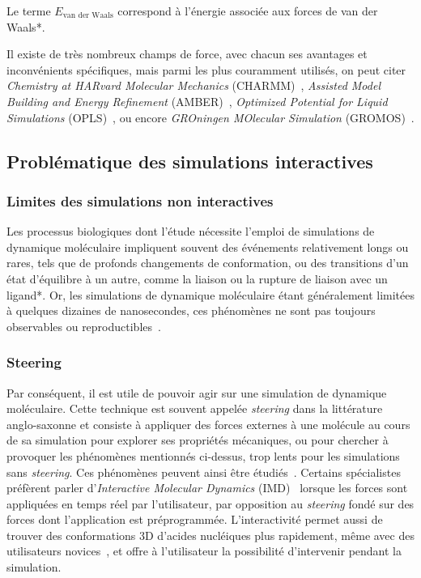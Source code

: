 	Le terme $E_\text{van der Waals}$ correspond à l'énergie associée aux forces de van der Waals*.
	
	Il existe de très nombreux champs de force, avec chacun ses avantages et inconvénients spécifiques, mais parmi les plus couramment utilisés, on peut citer \emph{Chemistry at HARvard Molecular Mechanics} (CHARMM)~\cite{brooks1983charmm, brooks2009charmm}, \emph{Assisted Model Building and Energy Refinement} (AMBER)~\cite{cornell1995second, wang2004development}, \emph{Optimized Potential for Liquid Simulations} (OPLS)~\cite{jorgensen1996development, kaminski2001evaluation}, ou encore \emph{GROningen MOlecular Simulation} (GROMOS)~\cite{scott1999gromos, oostenbrink2004biomolecular}.
	
    
	\FloatBarrier \subsection{Problématique des simulations interactives}
	
	\subsubsection{Limites des simulations non interactives}
	Les processus biologiques dont l'étude nécessite l'emploi de simulations de dynamique moléculaire impliquent souvent des événements relativement longs ou rares, tels que de profonds changements de conformation, ou des transitions d'un état d'équilibre à un autre, comme la liaison ou la rupture de liaison avec un ligand*. Or, les simulations de dynamique moléculaire étant généralement limitées à quelques dizaines de nanosecondes, ces phénomènes ne sont pas toujours observables ou reproductibles~\cite{phillips2005scalable}.
	
	\subsubsection{Steering}
	Par conséquent, il est utile de pouvoir agir sur une simulation de dynamique moléculaire. Cette technique est souvent appelée \emph{steering} dans la littérature anglo-saxonne et consiste à appliquer des forces externes à une molécule au cours de sa simulation pour explorer ses propriétés mécaniques, ou pour chercher à provoquer les phénomènes mentionnés ci-dessus, trop lents pour les simulations sans \emph{steering}. Ces phénomènes peuvent ainsi être étudiés~\cite{izrailev1999steered, isralewitz2001steered, isralewitz2001steered}. Certains spécialistes~\cite{phillips2005scalable} préfèrent parler d'\emph{Interactive Molecular Dynamics} (IMD)~\cite{stone2001system, grayson2003mechanisms} lorsque les forces sont appliquées en temps réel par l'utilisateur, par opposition au \emph{steering} fondé sur des forces dont l'application est préprogrammée. L'interactivité permet aussi de trouver des conformations 3D d'acides nucléiques plus rapidement, même avec des utilisateurs novices~\cite{mazzanti2017can}, et offre à l'utilisateur la possibilité d'intervenir pendant la simulation.
	
